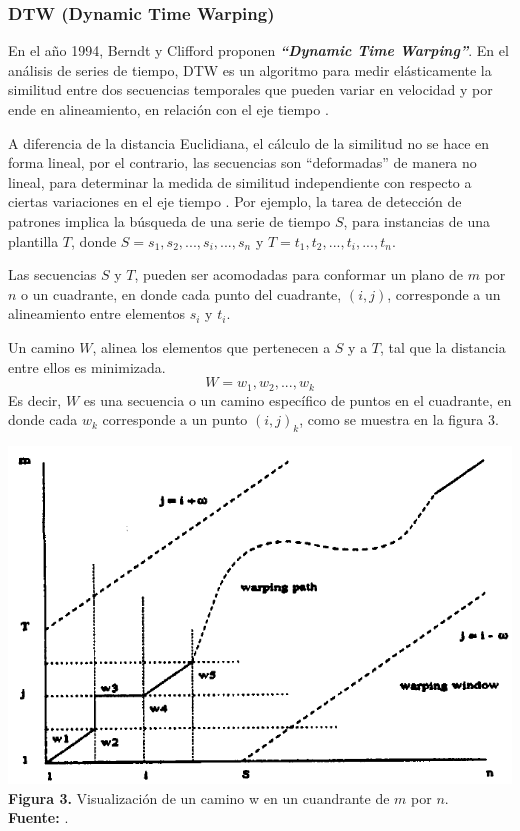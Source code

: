 \subsubsection{DTW (Dynamic Time Warping)}
En el a\~no 1994, Berndt y Clifford \cite{dtw} proponen \textit{\textbf{\enquote{Dynamic Time Warping}}}. En el an\'alisis de series de tiempo, DTW es un algoritmo para medir el\'asticamente la similitud entre dos secuencias temporales que pueden variar en velocidad y por ende en alineamiento, en relaci\'on con el eje tiempo \cite{concepts}.\par A diferencia de la distancia Euclidiana, el c\'alculo de la similitud no se hace en forma lineal, por el contrario, las secuencias son \enquote{deformadas} de manera no li\-neal, para determinar la medida de similitud independiente con respecto a ciertas variaciones en el eje tiempo \cite{dtw}. Por ejemplo, la tarea de detecci\'on de patrones implica la b\'usqueda de una serie de tiempo $S$, para instancias de una plantilla $T$, donde $S = s_1, s_2, ..., s_i, ..., s_n$ y $T = t_1, t_2, ..., t_i, ..., t_n$.\par
Las secuencias $S$ y $T$, pueden ser acomodadas para conformar un plano de $m$ por $n$ o un cuadrante, en donde cada punto del cuadrante, $(i, j)$, corresponde a un alineamiento entre elementos $s_i$ y $t_i$.\par
Un camino $W$, alinea los elementos que pertenecen a $S$ y a $T$, tal que la distancia entre ellos es minimizada.\\
\begin{equation}
W = w_1, w_2, ..., w_k
\end{equation}
Es decir, $W$ es una secuencia o un camino espec\'ifico de puntos en el cuadrante, en donde cada $w_k$ corresponde a un punto $(i,j)_k$, como se muestra en la figura 3.
\begin{center}
\includegraphics[scale=0.7]{dtw.png}\\
\vspace*{10pt}
\footnotesize{\textbf{Figura 3.} Visualizaci\'on de un camino w en un cuandrante de $m$ por $n$.}\\ \textbf{Fuente:} \cite{dtw}.
\end{center}

